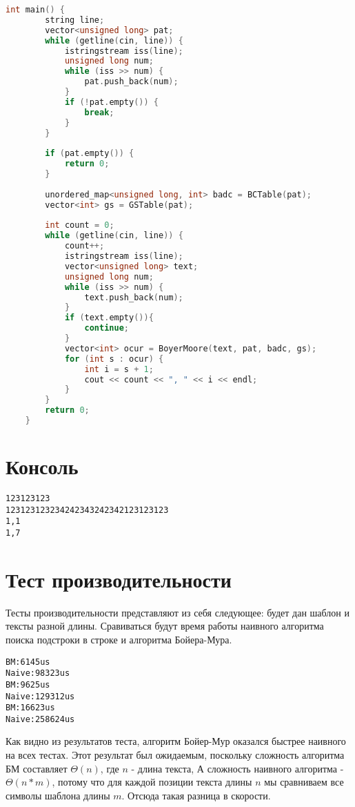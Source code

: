 \documentclass[pdf, unicode, 12pt, a4paper,oneside,fleqn]{article}
\begin{document}
\begin{lstlisting}[language=C]
    int main() {
        string line;
        vector<unsigned long> pat;
        while (getline(cin, line)) {
            istringstream iss(line);
            unsigned long num;
            while (iss >> num) {
                pat.push_back(num);
            }
            if (!pat.empty()) {
                break; 
            }
        }
        
        if (pat.empty()) {
            return 0;  
        }
    
        unordered_map<unsigned long, int> badc = BCTable(pat);
        vector<int> gs = GSTable(pat);
    
        int count = 0;
        while (getline(cin, line)) {
            count++;
            istringstream iss(line);
            vector<unsigned long> text;
            unsigned long num;
            while (iss >> num) {
                text.push_back(num);
            }
            if (text.empty()){
                continue; 
            }
            vector<int> ocur = BoyerMoore(text, pat, badc, gs);
            for (int s : ocur) {
                int i = s + 1; 
                cout << count << ", " << i << endl;
            }
        }
        return 0;
    }
\end{lstlisting}


\section{Консоль}
\begin{alltt}
    123 123 123
    123 123 123 23424234 324234 2 123 123 123
    1, 1
    1, 7
\end{alltt}
\pagebreak
\section{Тест производительности}

Тесты производительности представляют из себя следующее: будет дан шаблон и тексты разной длины. Сравиваться будут время работы наивного алгоритма поиска подстроки в строке и алгоритма Бойера-Мура.

\begin{alltt}
    BM: 6145 us
    Naive: 98323 us
    BM: 9625 us
    Naive: 129312 us
    BM: 16623 us
    Naive: 258624 us
\end{alltt}

Как видно из результатов теста, алгоритм Бойер-Мур оказался быстрее наивного на всех тестах. Этот результат был ожидаемым, поскольку сложность алгоритма БМ составляет $\Theta(n)$, где $n$ - длина текста, А сложность наивного алгоритма - $\Theta(n * m)$, потому что для каждой позиции текста длины $n$ мы сравниваем все символы шаблона длины $m$. Отсюда такая разница в скорости. 
\pagebreak
\end{document}
